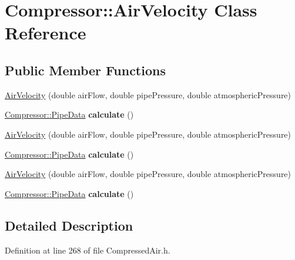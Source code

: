 \hypertarget{class_compressor_1_1_air_velocity}{}\section{Compressor\+:\+:Air\+Velocity Class Reference}
\label{class_compressor_1_1_air_velocity}
\subsection*{Public Member Functions}
\begin{DoxyCompactItemize}
\item 
\hyperlink{class_compressor_1_1_air_velocity_a53449e5354b1e33db644078ce4d92e4b}{Air\+Velocity} (double air\+Flow, double pipe\+Pressure, double atmospheric\+Pressure)
\item 
\mbox{\label{class_compressor_1_1_air_velocity_af17f62700c50a692b4a0db98a11c880c}} 
\hyperlink{struct_compressor_1_1_pipe_data}{Compressor\+::\+Pipe\+Data} {\bfseries calculate} ()
\item 
\hyperlink{class_compressor_1_1_air_velocity_a53449e5354b1e33db644078ce4d92e4b}{Air\+Velocity} (double air\+Flow, double pipe\+Pressure, double atmospheric\+Pressure)
\item 
\mbox{\label{class_compressor_1_1_air_velocity_af17f62700c50a692b4a0db98a11c880c}} 
\hyperlink{struct_compressor_1_1_pipe_data}{Compressor\+::\+Pipe\+Data} {\bfseries calculate} ()
\item 
\hyperlink{class_compressor_1_1_air_velocity_a53449e5354b1e33db644078ce4d92e4b}{Air\+Velocity} (double air\+Flow, double pipe\+Pressure, double atmospheric\+Pressure)
\item 
\mbox{\label{class_compressor_1_1_air_velocity_af17f62700c50a692b4a0db98a11c880c}} 
\hyperlink{struct_compressor_1_1_pipe_data}{Compressor\+::\+Pipe\+Data} {\bfseries calculate} ()
\end{DoxyCompactItemize}


\subsection{Detailed Description}


Definition at line 268 of file Compressed\+Air.\+h.



